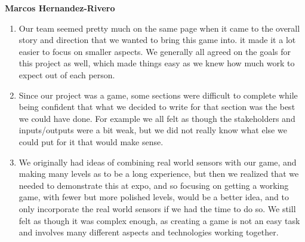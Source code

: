 \documentclass{article}
\begin{document}
\textbf{Marcos Hernandez-Rivero}
\begin{enumerate}
\item{Our team seemed pretty much on the same page when it came to the overall story and direction that we wanted to bring this game into. it made it a lot easier to focus on smaller aspects. We generally all agreed on the goals for this project as well, which made things easy as we knew how much work to expect out of each person.}
\item{Since our project was a game, some sections were difficult to complete while being confident that what we decided to write for that section was the best we could have done. For example we all felt as though the stakeholders and inputs/outputs were a bit weak, but we did not really know what else we could put for it that would make sense.}
\item{We originally had ideas of combining real world sensors with our game, and making many levels as to be a long experience, but then we realized that we needed to demonstrate this at expo, and so focusing on getting a working game, with fewer but more polished levels, would be a better idea, and to only incorporate the real world sensors if we had the time to do so. We still felt as though it was complex enough, as creating a game is not an easy task and involves many different aspects and technologies working together.}
\end{enumerate} 
\end{document}

